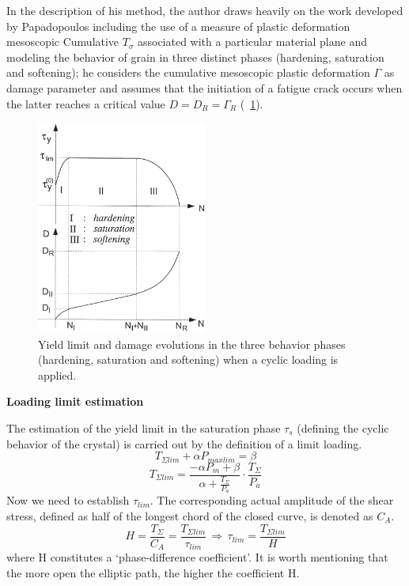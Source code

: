 \documentclass[3p,times,procedia,number]{elsarticle}
\newcommand{\figref}[1]{\figurename~\ref{#1}}
\begin{document}
In the description of his method, the author draws heavily on the work developed by
Papadopoulos including the use of a measure of plastic deformation mesoscopic
Cumulative $T_\sigma$ associated with a particular material plane and modeling the behavior of
grain in three distinct phases (hardening, saturation and softening); he considers the cumulative mesoscopic plastic deformation $\Gamma$ as damage parameter and assumes that the initiation of a fatigue crack occurs when the latter reaches a
critical value $D = D_R = \Gamma_R$ (\figref{3phases}). 
\begin{figure}[h!]
	\centering
	\includegraphics[width=0.5\textwidth]{figures//3phases.png} 
	\caption{Yield limit and damage evolutions in the three behavior phases (hardening, saturation and softening) when a cyclic loading	is applied.}
	\label{3phases}
\end{figure}

\textbf{Loading limit estimation}

The estimation of the yield limit in the saturation phase $\tau_s$ (defining the cyclic behavior of the crystal) is
carried out by the definition of a limit loading.
\begin{equation}
T_{\Sigma lim}+\alpha P_{max lim}=\beta
\end{equation}
\begin{equation}
T_{\Sigma lim}=\frac{-\alpha P_m+\beta}{\alpha+\frac{T_\Sigma}{P_a}}\cdot\frac{T_\Sigma}{P_a}
\label{Tlim}
\end{equation}
Now we need to establish $\tau_{lim}$. The corresponding actual amplitude of the shear stress,
defined as half of the longest chord of the closed curve, is denoted as $C_A$.
\begin{equation}
H=\frac{T_{\Sigma}}{C_A}=\frac{T_{\Sigma lim}}{\tau_{lim}} \, \Rightarrow \, \tau_{lim}=\frac{T_{\Sigma lim}}{H}
\label{eqH}
\end{equation}
where H constitutes a ‘phase-difference coefficient’.
It is worth mentioning that the more open the elliptic
path, the higher the coefficient H. 
\end{document}
